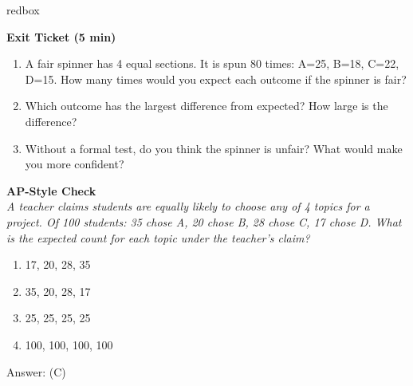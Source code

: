 \documentclass[10pt]{article}
\begin{document}
\begin{skillbox}{redbox}
\begin{minipage}[t]{0.48\linewidth}
    \textbf{Exit Ticket (5 min)}
    \begin{enumerate}
        \item A fair spinner has 4 equal sections. It is spun 80 times:
              A=25, B=18, C=22, D=15. How many times would you expect each
              outcome if the spinner is fair?
        \item Which outcome has the largest difference from expected?
              How large is the difference?
        \item Without a formal test, do you think the spinner is unfair?
              What would make you more confident?
    \end{enumerate}
\end{minipage}
\hfill
\begin{minipage}[t]{0.48\linewidth}
    \textbf{AP-Style Check}\\
    \textit{A teacher claims students are equally likely to choose any of 4 topics
    for a project. Of 100 students: 35 chose A, 20 chose B, 28 chose C, 17 chose D.
    What is the expected count for each topic under the teacher's claim?}
    \begin{enumerate}[label=(\Alph*)]
        \item 17, 20, 28, 35
        \item 35, 20, 28, 17
        \item 25, 25, 25, 25
        \item 100, 100, 100, 100
    \end{enumerate}
    Answer: (C)
\end{minipage}
\end{skillbox}
\end{document}
